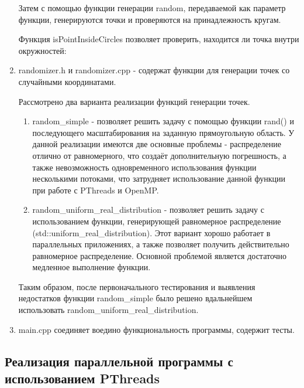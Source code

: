 \begin{enumerate}
Затем с помощью функции генерации random, передаваемой как параметр функции, генерируются точки и проверяются на принадлежность кругам.



Функция isPointInsideCircles позволяет проверить, находится ли точка внутри окружностей:



\item randomizer.h и randomizer.cpp - содержат функции для генерации точек со случайными координатами.

Рассмотрено два варианта реализации функций генерации точек.

\begin{enumerate}
	\item random\_simple - позволяет решить задачу с помощью функции rand() и последующего масштабирования на заданную прямоугольную область. У данной реализации имеются две основные проблемы - распределение отлично от равномерного, что создаёт дополнительную погрешность, а также невозможность одновременного использования функции несколькими потоками, что затрудняет использование данной функции при работе с PThreads и OpenMP.
			
	\item random\_uniform\_real\_distribution - позволяет решить задачу с использованием функции,  генерирующей равномерное распределение (std::uniform\_real\_distribution). Этот вариант хорошо работает в параллельных приложениях, а также позволяет получить действительно равномерное распределение. Основной проблемой является достаточно медленное выполнение функции.
	
\end{enumerate}

Таким образом, после первоначального тестирования и выявления недостатков функции random\_simple было решено вдальнейшем использовать random\_uniform\_real\_distribution.

\item main.cpp соединяет воедино функциональность программы, содержит тесты.

\end{enumerate}


\subsection{Реализация параллельной программы с использованием PThreads}


